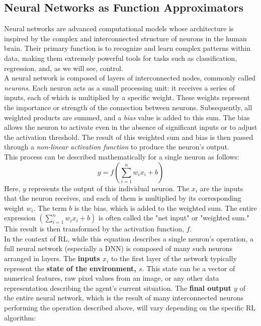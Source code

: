 \subsection{Neural Networks as Function Approximators}
\noindent
Neural networks are advanced computational models whose architecture is inspired by the complex and interconnected structure of neurons in the human brain. Their primary function is to recognize and learn complex patterns within data, making them extremely powerful tools for tasks such as classification, regression, and, as we will see, control.
\\ \noindent
A neural network is composed of layers of interconnected nodes, commonly called \textit{neurons}. Each neuron acts as a small processing unit: it receives a series of inputs, each of which is multiplied by a specific weight. These weights represent the importance or strength of the connection between neurons. Subsequently, all weighted products are summed, and a \textit{bias} value is added to this sum. The bias allows the neuron to activate even in the absence of significant inputs or to adjust the activation threshold. The result of this weighted sum and bias is then passed through a \textit{non-linear activation function} to produce the neuron's output.
\\ \noindent
This process can be described mathematically for a single neuron as follows:
\begin{equation}
 y = f\left(\sum_{i=1}^{n} w_i x_i + b\right)
\end{equation}
\noindent
Here, $y$ represents the output of this individual neuron. The $x_i$ are the inputs that the neuron receives, and each of them is multiplied by its corresponding weight $w_i$. The term $b$ is the bias, which is added to the weighted sum. The entire expression $\left(\sum_{i=1}^{n} w_i x_i + b\right)$ is often called the "net input" or "weighted sum." This result is then transformed by the activation function, $f$.
\\ \noindent
In the context of RL, while this equation describes a single neuron's operation, a full neural network (especially a DNN) is composed of many such neurons arranged in layers. The \textbf{inputs $x_i$} to the first layer of the network typically represent the \textbf{state of the environment, $s$}. This state can be a vector of numerical features, raw pixel values from an image, or any other data representation describing the agent's current situation. The \textbf{final output $y$} of the entire neural network, which is the result of many interconnected neurons performing the operation described above, will vary depending on the specific RL algorithm:
